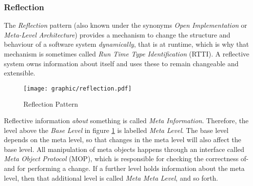 %
%
%
%
%
%
%

\subsubsection{Reflection}
\label{reflection_heading}

The \emph{Reflection} pattern \cite{buschmann} (also known under the synonyms
\emph{Open Implementation} or \emph{Meta-Level Architecture}) provides a
mechanism to change the structure and behaviour of a software system
\emph{dynamically}, that is at runtime, which is why that mechanism is sometimes
called \emph{Run Time Type Identification} (RTTI). A reflective system owns
information about itself and uses these to remain changeable and extensible.

\begin{figure}[ht]
    \begin{center}
        \texttt{[image: graphic/reflection.pdf]}
        \caption{Reflection Pattern}
        \label{reflection_figure}
    \end{center}
\end{figure}

Reflective information \emph{about} something is called \emph{Meta Information}.
Therefore, the level above the \emph{Base Level} in figure \ref{reflection_figure}
is labelled \emph{Meta Level}. The base level depends on the meta level, so that
changes in the meta level will also affect the base level. All manipulation of
meta objects happens through an interface called \emph{Meta Object Protocol}
(MOP), which is responsible for checking the correctness of- and for performing
a change. If a further level holds information about the meta level, then that
additional level is called \emph{Meta Meta Level}, and so forth.

